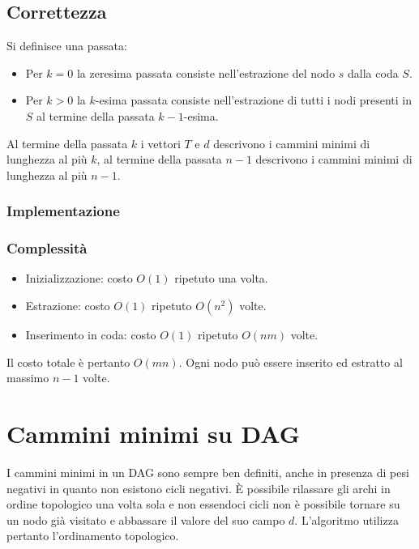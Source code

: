 	\subsection{Correttezza}
	Si definisce una passata:
	\begin{itemize}
		\item Per $k=0$ la zeresima passata consiste nell'estrazione del nodo $s$ dalla coda $S$.
		\item Per $k>0$ la $k$-esima passata consiste nell'estrazione di tutti i nodi presenti in $S$ al termine
		      della passata $k-1$-esima.
	\end{itemize}
	Al termine della passata $k$ i vettori $T$ e $d$ descrivono i cammini minimi di lunghezza al pi\`u $k$, al termine della passata $n-1$ descrivono i cammini minimi di lunghezza al pi\`u
	$n-1$.
	\subsubsection{Implementazione}
	
	\subsubsection{Complessit\`a}
	\begin{itemize}
		\item Inizializzazione: costo $O(1)$ ripetuto una volta.
		\item Estrazione: costo $O(1)$ ripetuto $O(n^2)$ volte.
		\item Inserimento in coda: costo $O(1)$ ripetuto $O(nm)$ volte.
	\end{itemize}
	Il costo totale \`e pertanto $O(mn)$. Ogni nodo pu\`o essere inserito ed estratto al massimo $n-1$ volte.
\section{Cammini minimi su DAG}
	I cammini minimi in un DAG sono sempre ben definiti, anche in presenza di pesi negativi in quanto
	non esistono cicli negativi. \`E possibile rilassare gli archi in ordine topologico una volta sola
	e non essendoci cicli non \`e possibile tornare su un nodo gi\`a visitato e abbassare il valore del
	suo campo $d$. L'algoritmo utilizza pertanto l'ordinamento topologico.\\
	
